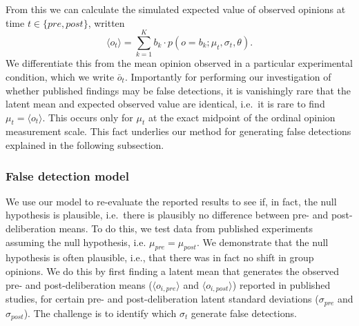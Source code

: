 From this we can calculate the simulated expected value of observed
opinions at time $t \in \{pre,post\}$, written
\begin{equation}
  \langle o_t \rangle = 
        \sum_{k=1}^K b_k \cdot p(o = b_k ; \mu_t, \sigma_t, \theta).
  \label{eq:expectedOpinion}
\end{equation}
\noindent
We differentiate this from the mean opinion observed in a particular 
experimental condition, which we write $\bar{o}_t$. Importantly for performing
our investigation of whether published findings may be false detections,
it is vanishingly rare that the latent mean and expected observed value
are identical, i.e.\ it is rare to find $\mu_t = \langle o_t \rangle$.
This occurs only for $\mu_t$ at the exact midpoint of the ordinal
opinion measurement scale. This fact underlies our method for generating
false detections explained in the following subsection.



\subsubsection{False detection model}


We use our model to re-evaluate the reported results to see if, in fact,
the null hypothesis is plausible, i.e.\ there is plausibly no difference 
between pre- and post-deliberation means.
To do this, we test data from published experiments assuming the null
hypothesis, i.e.  $\mu_{pre} = \mu_{post}$. 
We demonstrate that the null hypothesis 
is often plausible, i.e., that there was in fact no shift in group opinions.
We do this by first finding a latent mean that generates the observed pre- and 
post-deliberation means ($\langle o_{i,pre} \rangle$ and $\langle o_{i,post} \rangle$) 
reported in published studies, 
for certain pre- and post-deliberation latent standard deviations 
($\sigma_{pre}$ and $\sigma_{post}$). The challenge is to identify which
$\sigma_t$ generate false detections.

